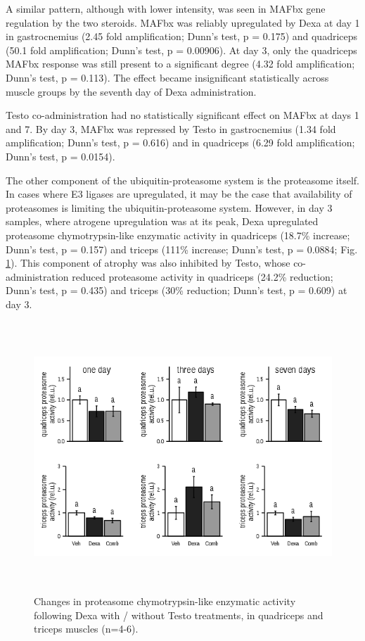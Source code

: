\documentclass[12pt,english]{report}\usepackage[]{graphicx}\usepackage[]{color}
\newenvironment{knitrout}{}{} %
\begin{document}
A similar pattern, although with lower intensity, was seen in MAFbx
gene regulation by the two steroids. MAFbx was reliably upregulated
by Dexa at day 1 in gastrocnemius (2.45
fold amplification; Dunn's test, p = 0.175)
and quadriceps (50.1
fold amplification; Dunn's test, p = 0.00906).
At day 3, only the quadriceps MAFbx response was still present to
a significant degree (4.32
fold amplification; Dunn's test, p = 0.113).
The effect became insignificant statistically across muscle groups
by the seventh day of Dexa administration.

Testo co-administration had no statistically significant effect on
MAFbx at days 1 and 7. By day 3, MAFbx was repressed by Testo in gastrocnemius
(1.34
fold amplification; Dunn's test, p = 0.616)
and in quadriceps (6.29
fold amplification; Dunn's test, p = 0.0154).

The other component of the ubiquitin-proteasome system is the proteasome
itself. In cases where E3 ligases are upregulated, it may be the case
that availability of proteasomes is limiting the ubiquitin-proteasome
system. However, in day 3 samples, where atrogene upregulation was
at its peak, Dexa upregulated proteasome chymotrypsin-like enzymatic
activity in quadriceps (18.7\%
increase; Dunn's test, p = 0.157)
and triceps (111\%
increase; Dunn's test, p = 0.0884;
Fig. \ref{fig:Proteasome-enzymatic-activity}). This component of
atrophy was also inhibited by Testo, whose co-administration reduced
proteasome activity in quadriceps (24.2\%
reduction; Dunn's test, p = 0.435)
and triceps (30\%
reduction; Dunn's test, p = 0.609)
at day 3.

\begin{figure}
\begin{knitrout}
\color{fgcolor}
\includegraphics[width=6in,height=4in]{figure/proteasomeactivity-1} 

\end{knitrout}

\protect\caption[Changes in proteasome enzymatic activity following Dexa with / without
Testo treatments.]{Changes in proteasome chymotrypsin-like enzymatic activity following
Dexa with / without Testo treatments, in quadriceps and triceps muscles
(n=4-6).\label{fig:Proteasome-enzymatic-activity}}
\end{figure}
\end{document}
